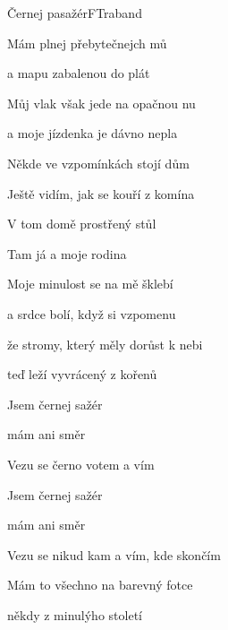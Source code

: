 \setcounter{page}{16}
\begin{song}{Černej pasažér}{F}{Traband}

\begin{SBVerse}

Mám  plnej přebytečnejch mů

a mapu zabalenou do plát

Můj vlak však jede na opačnou nu

a moje jízdenka je dávno nepla


\end{SBVerse}

\begin{SBVerse}

Někde ve vzpomínkách stojí dům

Ještě vidím, jak se kouří z komína

V tom domě prostřený stůl

Tam já a moje rodina

\end{SBVerse}

\begin{SBVerse}

Moje minulost se na mě šklebí

a srdce bolí, když si vzpomenu

že stromy, který měly dorůst k nebi

teď leží vyvrácený z kořenů

\end{SBVerse}

\begin{SBChorus}

Jsem černej sažér

mám  ani směr

Vezu se černo votem a vím

Jsem černej sažér

mám  ani směr

Vezu se nikud kam a vím, kde skončím

\end{SBChorus}

\begin{SBVerse}

Mám to všechno na barevný fotce

někdy z minulýho století


\end{SBVerse}
\end{song}
